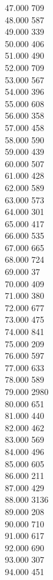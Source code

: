 { 47.000	709 \\
 48.000	587 \\
 49.000	339 \\
 50.000	406 \\
 51.000	490 \\
 52.000	709 \\
 53.000	567 \\
 54.000	396 \\
 55.000	608 \\
 56.000	358 \\
 57.000	458 \\
 58.000	590 \\
 59.000	439 \\
 60.000	507 \\
 61.000	428 \\
 62.000	589 \\
 63.000	573 \\
 64.000	301 \\
 65.000	417 \\
 66.000	535 \\
 67.000	665 \\
 68.000	724 \\
 69.000	37 \\
 70.000	409 \\
 71.000	380 \\
 72.000	677 \\
 73.000	475 \\
 74.000	841 \\
 75.000	209 \\
 76.000	597 \\
 77.000	633 \\
 78.000	589 \\
 79.000	2980 \\
 80.000	651 \\
 81.000	440 \\
 82.000	462 \\
 83.000	569 \\
 84.000	496 \\
 85.000	605 \\
 86.000	211 \\
 87.000	429 \\
 88.000	3136 \\
 89.000	208 \\
 90.000	710 \\
 91.000	617 \\
 92.000	690 \\
 93.000	307 \\
 94.000	451 \\
}
